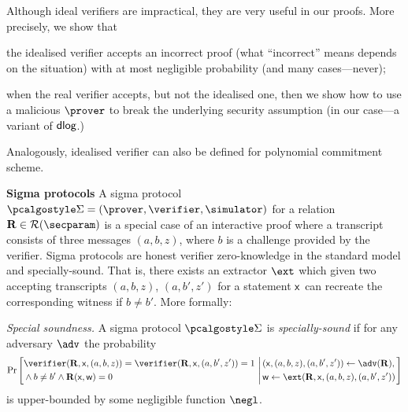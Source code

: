 \documentclass[runningheads,11pt]{llncs}
\newcommand{\oursubsub}[1] {\smallskip\noindent\textbf{#1}}
\newcommand{\ourpar}[1] {\smallskip\noindent\emph{#1}}
\begin{document}
Although ideal verifiers are impractical, they are very useful in our
proofs. More precisely, we show that
\begin{compactenum}
\item the idealised verifier accepts an incorrect proof (what ``incorrect''
  means depends on the situation) with at most negligible probability (and many
  cases---never);
\item when the real verifier accepts, but not the idealised one, then we show
  how to use a malicious $\prover$ to break the underlying security assumption
  (in our case---a variant of $\mathsf{dlog}$.)
\end{compactenum}

Analogously, idealised verifier can also be defined for polynomial commitment scheme.

\oursubsub{Sigma protocols}
A sigma protocol $\sigmaprot = (\prover, \verifier, \simulator)$ for a relation
$\REL \in \RELGEN(\secparam)$ is a special case of an interactive proof where a
transcript consists of three messages $(a, b, z)$, where $b$ is a challenge
provided by the verifier. Sigma protocols are honest verifier zero-knowledge in
the standard model and specially-sound. That is, there exists an extractor
$\ext$ which given two accepting transcripts $(a, b, z)$, $(a, b', z')$ for a
statement $\mathsf{x}$ can recreate the corresponding witness if $b \neq b'$.
More formally:

\ourpar{Special soundness.}
A sigma protocol $\sigmaprot$ is \emph{specially-sound}
  if for any adversary $\adv$ the probability
\[
\Pr\left[
\begin{aligned}
& \verifier(\REL, \inp, (a, b, z)) = %
\verifier(\REL, \inp, (a, b', z')) = 1 \\
& \land b \neq b' \land \REL(\inp, \wit) = 0 \\
\end{aligned}
\,\left|\,
\begin{aligned}
& (\inp, (a, b, z), (a, b', z')) \gets \adv(\REL), \\ %
& \wit \gets \ext(\REL, \inp, (a, b, z), (a, b', z'))\\
\end{aligned}
\right.\right]
\]
is upper-bounded by some negligible function $\negl$.
\end{document}
